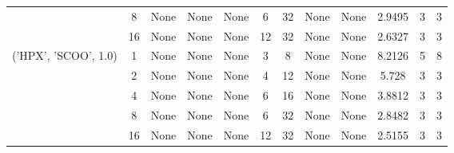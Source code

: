 \begin{tabular}{cccccccccccc}
& 8& None& None& None& 6& 32& None& None& 2.9495& 3& 3\\
& 16& None& None& None& 12& 32& None& None& 2.6327& 3& 3\\
\hline
\multirow{5}{*}{('HPX', 'SCOO', 1.0)}& 1& None& None& None& 3& 8& None& None& 8.2126& 5& 8\\
& 2& None& None& None& 4& 12& None& None& 5.728& 3& 3\\
& 4& None& None& None& 6& 16& None& None& 3.8812& 3& 3\\
& 8& None& None& None& 6& 32& None& None& 2.8482& 3& 3\\
& 16& None& None& None& 12& 32& None& None& 2.5155& 3& 3\\
\hline
\end{tabular}



